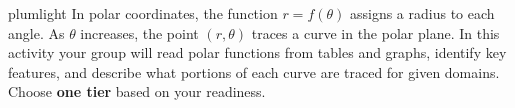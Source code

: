 \documentclass[10pt]{article}
\begin{document}
\namepartnerperiod

\vspace{0.08in}

\begin{scenariobox}{plumlight}
In polar coordinates, the function $r = f(\theta)$ assigns a radius to each angle.
As $\theta$ increases, the point $(r, \theta)$ traces a curve in the polar plane.
In this activity your group will read polar functions from tables and graphs,
identify key features, and describe what portions of each curve are traced for
given domains. Choose \textbf{one tier} based on your readiness.
\end{scenariobox}

\vspace{0.08in}
\end{document}
